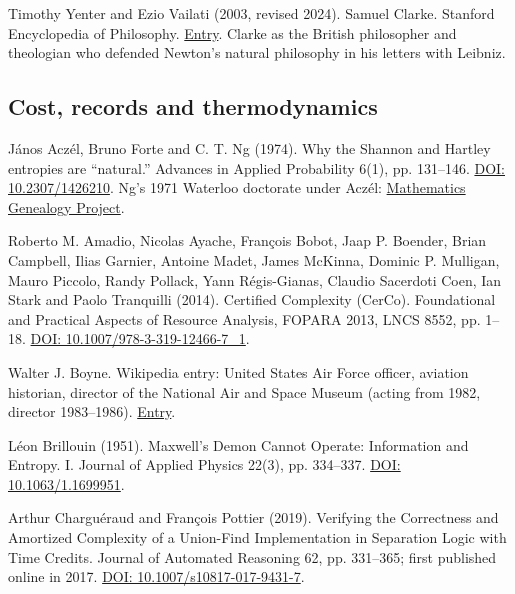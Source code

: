 \documentclass[11pt,twoside]{article}
\theoremstyle{thielethm}
\theoremstyle{thieledef}
\theoremstyle{thieledef}
\theoremstyle{thieledef}
\theoremstyle{thielethm}
\theoremstyle{thieleobs}
\theoremstyle{thielethm}
\begin{document}
\noindent Timothy Yenter and Ezio Vailati (2003, revised 2024). Samuel Clarke. Stanford Encyclopedia of Philosophy. \href{https://plato.stanford.edu/entries/clarke/}{Entry}. Clarke as the British philosopher and theologian who defended Newton's natural philosophy in his letters with Leibniz.
\par\medskip

\subsection{Cost, records and thermodynamics}



\noindent J\'anos Acz\'el, Bruno Forte and C. T. Ng (1974). Why the Shannon and Hartley entropies are ``natural.'' Advances in Applied Probability 6(1), pp. 131--146. \href{https://doi.org/10.2307/1426210}{DOI: 10.2307/1426210}. Ng's 1971 Waterloo doctorate under Acz\'el: \href{https://mathgenealogy.org/id.php?id=102040}{Mathematics Genealogy Project}.
\par\medskip

\noindent Roberto M. Amadio, Nicolas Ayache, François Bobot, Jaap P. Boender, Brian Campbell, Ilias Garnier, Antoine Madet, James McKinna, Dominic P. Mulligan, Mauro Piccolo, Randy Pollack, Yann Régis-Gianas, Claudio Sacerdoti Coen, Ian Stark and Paolo Tranquilli (2014). Certified Complexity (CerCo). Foundational and Practical Aspects of Resource Analysis, FOPARA 2013, LNCS 8552, pp. 1--18. \href{https://doi.org/10.1007/978-3-319-12466-7_1}{DOI: 10.1007/978-3-319-12466-7\_1}.
\par\medskip

\noindent Walter J. Boyne. Wikipedia entry: United States Air Force officer, aviation historian, director of the National Air and Space Museum (acting from 1982, director 1983--1986). \href{https://en.wikipedia.org/wiki/Walter_J._Boyne}{Entry}.
\par\medskip

\noindent Léon Brillouin (1951). Maxwell's Demon Cannot Operate: Information and Entropy. I. Journal of Applied Physics 22(3), pp. 334--337. \href{https://doi.org/10.1063/1.1699951}{DOI: 10.1063/1.1699951}.
\par\medskip

\noindent Arthur Charguéraud and François Pottier (2019). Verifying the Correctness and Amortized Complexity of a Union-Find Implementation in Separation Logic with Time Credits. Journal of Automated Reasoning 62, pp. 331--365; first published online in 2017. \href{https://doi.org/10.1007/s10817-017-9431-7}{DOI: 10.1007/s10817-017-9431-7}.
\par\medskip
\end{document}
